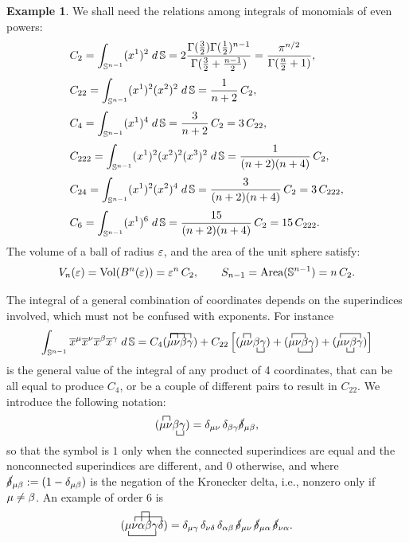 \documentclass[letterpaper, reqno, 11pt]{amsart}
\theoremstyle{definition}
\newtheorem{example}[theorem]{Example}
\theoremstyle{remark}
\numberwithin{equation}{section}
\begin{document}
\begin{example}\label{ex:constants}
	We shall need the relations among integrals of monomials of even powers:
\begin{align*}
	& C_{2} = \int_{{\mathbb S}^{n-1}} (x^1)^{2}\; d\,{\mathbb S}= 2\frac{\Gamma(\frac{3}{2})\Gamma(\frac{1}{2})^{n-1}}{\Gamma(\frac{3}{2}+\frac{n-1}{2})}=\frac{\pi^{n/2}}{\Gamma(\frac{n}{2}+1)}, \\[1mm]
	& C_{22}= \int_{{\mathbb S}^{n-1}} (x^1)^{2}(x^2)^2\; d\,{\mathbb S} = \frac{1}{n+2}\, C_2, \\[1mm]
	& C_{4}= \int_{{\mathbb S}^{n-1}} (x^1)^{4}\; d\,{\mathbb S} = \frac{3}{n+2}\, C_2 = 3\, C_{22}, \\[1mm]
	& C_{222}= \int_{{\mathbb S}^{n-1}} (x^1)^{2}(x^2)^2(x^3)^2\; d\,{\mathbb S} = \frac{1}{(n+2)(n+4)}\, C_2, \\[1mm]
	& C_{24}= \int_{{\mathbb S}^{n-1}} (x^1)^{2}(x^2)^4\; d\,{\mathbb S} = \frac{3}{(n+2)(n+4)}\, C_2 = 3\, C_{222}, \\[1mm]
	& C_{6}= \int_{{\mathbb S}^{n-1}} (x^1)^{6}\; d\,{\mathbb S} = \frac{15}{(n+2)(n+4)}\, C_2 = 15\, C_{222}.
\end{align*}
The volume of a ball of radius $\varepsilon$, and the area of the unit sphere satisfy:
\begin{equation*}
	V_n(\varepsilon)=\text{Vol}(B^n(\varepsilon)) = \varepsilon^n\, C_2,\quad\quad S_{n-1}=\text{Area}({\mathbb S}^{n-1})= n\, C_2.
\end{equation*}
\end{example}

The integral of a general combination of coordinates depends on the superindices involved, which must not be confused with exponents. For instance
$$
\int_{\SS^{n-1}}\cx^\mu\cx^\nu\cx^\bet\cx^\ga \; d\,\SS = 
C_4\contraction{(}{\mu}{}{\nu}\contraction{(}{\mu}{\nu}{\bet}\contraction{(}{\mu}{\nu\bet}{\ga}(\mu\nu\bet\ga) +
C_{22}\left[
\contraction{(}{\mu}{}{\nu}\bcontraction{(\mu\mu}{\bet}{}{\ga}(\mu\nu\bet\ga) + 
\contraction{(}{\mu}{\nu}{\ga}\bcontraction{(\mu}{\nu}{\bet}{\ga}(\mu\nu\bet\ga) + 
\contraction{(}{\mu}{\nu\bet}{\ga}\bcontraction{(\mu}{\nu}{}{\bet}(\mu\nu\bet\ga)
\right]
$$
is the general value of the integral of any product of 4 coordinates, that can be all equal to produce $C_4$, or be a couple of different pairs to result in $C_{22}$. We introduce the following notation:
$$
\contraction{(}{\mu}{}{\nu}\bcontraction{(\mu\mu}{\bet}{}{\ga}(\mu\nu\bet\ga) = \del_{\mu\nu}\,\del_{\bet\ga}\cancel{\del}_{\mu\bet},
$$
so that the symbol is $1$ only when the connected superindices are equal and the nonconnected superindices are different, and $0$ otherwise, and where $\cancel{\delta}_{\mu\beta}:=(1-\delta_{\mu\beta})$ is the negation of the Kronecker delta, i.e., nonzero only if $\mu\neq\beta$. An example of order 6 is 
$$
\bcontraction{(}{\mu}{\nu\al\bet}{\ga}\contraction{(\mu}{\nu}{\al\bet\ga}{\del}\contraction[2ex]{(\mu\nu}{\al}{}{\bet}(\mu\nu\al\bet\ga\del) = \del_{\mu\ga}\,\del_{\nu\del}\,\del_{\al\bet}\,\cancel{\del}_{\mu\nu}\,\cancel{\del}_{\mu\al}\,\cancel{\del}_{\nu\al}.
$$
\end{document}
